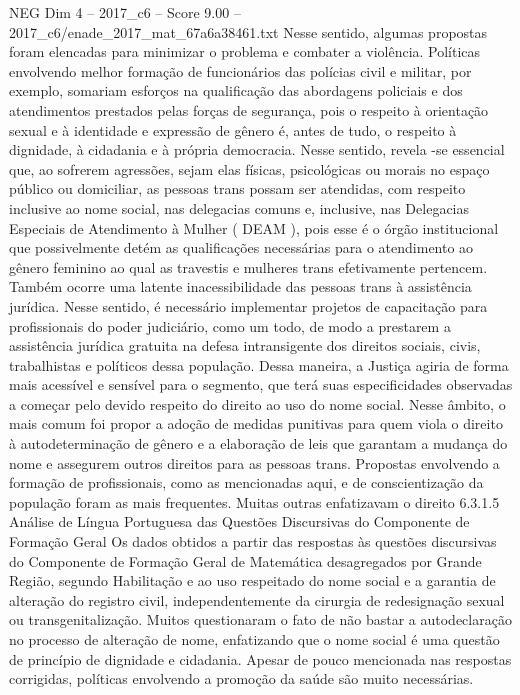 \begin{textsample}{NEG Dim 4 – 2017\_c6 – Score 9.00 – 2017\_c6/enade\_2017\_mat\_67a6a38461.txt}
Nesse sentido, algumas propostas foram elencadas para minimizar o problema e combater a violência.
Políticas envolvendo melhor formação de funcionários das polícias civil e militar, por exemplo, somariam esforços na qualificação das abordagens policiais e dos atendimentos prestados pelas forças de segurança, pois o respeito à orientação sexual e à identidade e expressão de gênero é, antes de tudo, o respeito à dignidade, à cidadania e à própria democracia.
Nesse sentido, revela -se essencial que, ao sofrerem agressões, sejam elas físicas, psicológicas ou morais no espaço público ou domiciliar, as pessoas trans possam ser atendidas, com respeito inclusive ao nome social, nas delegacias comuns e, inclusive, nas Delegacias Especiais de Atendimento à Mulher ( DEAM ), pois esse é o órgão institucional que possivelmente detém as qualificações necessárias para o atendimento ao gênero feminino ao qual as travestis e mulheres trans efetivamente pertencem.
Também ocorre uma latente inacessibilidade das pessoas trans à assistência jurídica.
Nesse sentido, é necessário implementar projetos de capacitação para profissionais do poder judiciário, como um todo, de modo a prestarem a assistência jurídica gratuita na defesa intransigente dos direitos sociais, civis, trabalhistas e políticos dessa população.
Dessa maneira, a Justiça agiria de forma mais acessível e sensível para o segmento, que terá suas especificidades observadas a começar pelo devido respeito do direito ao uso do nome social.
Nesse âmbito, o mais comum foi propor a adoção de medidas punitivas para quem viola o direito à autodeterminação de gênero e a elaboração de leis que garantam a mudança do nome e assegurem outros direitos para as pessoas trans.
Propostas envolvendo a formação de profissionais, como as mencionadas aqui, e de conscientização da população foram as mais frequentes.
Muitas outras enfatizavam o direito 6.3.1.5 Análise de Língua Portuguesa das Questões Discursivas do Componente de Formação Geral Os dados obtidos a partir das respostas às questões discursivas do Componente de Formação Geral de Matemática desagregados por Grande Região, segundo Habilitação e ao uso respeitado do nome social e a garantia de alteração do registro civil, independentemente da cirurgia de redesignação sexual ou transgenitalização.
Muitos questionaram o fato de não bastar a autodeclaração no processo de alteração de nome, enfatizando que o nome social é uma questão de princípio de dignidade e cidadania.
Apesar de pouco mencionada nas respostas corrigidas, políticas envolvendo a promoção da saúde são muito necessárias.

\end{textsample}
